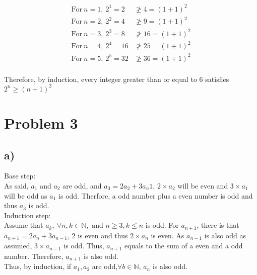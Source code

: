 \documentclass{article}
\begin{document}
    \begin{align*}
        \text {For}\ n=1, \ 2^1=2&\ngeq 4=(1+1)^2\\
        \text {For}\ n=2, \ 2^2=4&\ngeq 9=(1+1)^2\\
        \text {For}\ n=3, \ 2^3=8&\ngeq 16=(1+1)^2\\
        \text {For}\ n=4, \ 2^4=16&\ngeq 25=(1+1)^2\\
        \text {For}\ n=5, \ 2^5=32&\ngeq 36=(1+1)^2\\
    \end{align*}
    
    Therefore, by induction, every integer greater than or equal to 6 satisfies \(2^n\geqslant(n+1)^2\)
\section*{Problem 3}
    \subsection*{a)}
        Base step:\\
        As said, \(a_1\) and \(a_2\) are odd, and \(a_3=2a_{2}+3a_n{1}\), \(2\times a_{2}\) will be even and \(3 \times a_1\) will be odd as \(a_1\) is odd.
        Therfore, a odd number plus a even number is odd and thus \(a_3\) is odd.\\
        Induction step:\\
        Assume that \(a_k,\ \forall n,k\in \mathbb{N}, \text{ and } n\geqslant 3, k\leqslant n\) is odd. For \(a_{n+1}\),
        there is that \(a_{n+1}=2a_n+3a_{n-1}\), \(2\) is even and thus \(2\times a_{n}\) is even. As
        \(a_{n-1}\) is also odd as assumed, \(3\times a_{n-1}\) is odd. Thus, \(a_{n+1}\) equals to the sum
        of a even and a odd number. Therefore, \(a_{n+1}\) is also odd.\\
        Thus, by induction, if \(a_1,a_2\) are odd,\(\forall b\in \mathbb{N}\), \(a_n\) is also odd.
\end{document}
